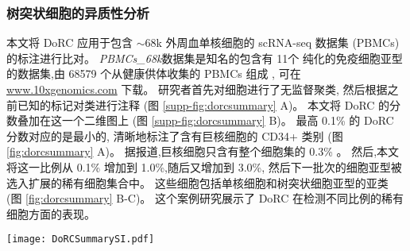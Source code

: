 

\subsubsection{树突状细胞的异质性分析}

本文将 DoRC 应用于包含 ${\sim}68$k 外周血单核细胞的 scRNA-seq 数据集 (PBMCs) 的标注进行比对。
 \textit{PBMCs\_68k}数据集是知名的包含有 11个 纯化的免疫细胞亚型的数据集,由 68579 个从健康供体收集的 PBMCs 组成 ,
可在 \url{www.10xgenomics.com} 下载。
研究者首先对细胞进行了无监督聚类,
然后根据之前已知的标记对类进行注释 (图 \ref{supp-fig:dorcsummary} A)。
本文将 DoRC 的分数叠加在这一个二维图上 (图 \ref{supp-fig:dorcsummary} B)。
最高 0.1\% 的 DoRC 分数对应的是最小的, 
清晰地标注了含有巨核细胞的 CD34+ 类别 (图 \ref{fig:dorcsummary} A)。
据报道,巨核细胞只含有整个细胞集的 0.3\% 。
然后,本文将这一比例从 0.1\% 增加到 1.0\%,随后又增加到 3.0\%,
然后下一批次的细胞亚型被选入扩展的稀有细胞集合中。
这些细胞包括单核细胞和树突状细胞亚型的亚类 (图 \ref{fig:dorcsummary} B-C)。
这个案例研究展示了 DoRC 在检测不同比例的稀有细胞方面的表现。

\begin{figure*}[!htbp]
    \centering
    \texttt{[image: DoRCSummarySI.pdf]}
    \caption{
    DoRC 在 PBMCs\_68k 上的性能评估。
    (A) 基于 t-SNE 的二维嵌入数据集可视化图,按 Zheng 等所报道的鉴定的不同类别用不同的颜色标记。
    (B) PBMCs\_68k 上细胞的 DoRC 得分热图。巨核细胞群 (0.3\%),是所有细胞类型中最稀有的细胞,获得了最高的 DoRC 分数。
    (C) 使用 IQR 阈值标准后 DoRC 识别的稀有细胞。
    }
    \label{supp-fig:dorcsummary}
\end{figure*}

